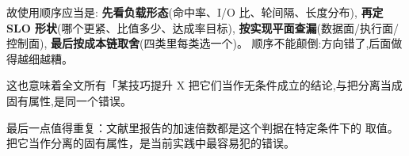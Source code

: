 故使用顺序应当是:
\textbf{先看负载形态}(命中率、I/O 比、轮间隔、长度分布),
\textbf{再定 SLO 形状}(哪个更紧、比值多少、达成率目标),
\textbf{按实现平面查漏}(数据面/执行面/控制面),
\textbf{最后按成本链取舍}(四类里每类选一个)。
顺序不能颠倒:方向错了,后面做得越细越糟。

这也意味着全文所有「某技巧提升 X%
把它们当作无条件成立的结论,与把分离当成固有属性,是同一个错误。

最后一点值得重复：文献里报告的加速倍数都是这个判据在特定条件下的
取值。把它当作分离的固有属性，是当前实践中最容易犯的错误。


